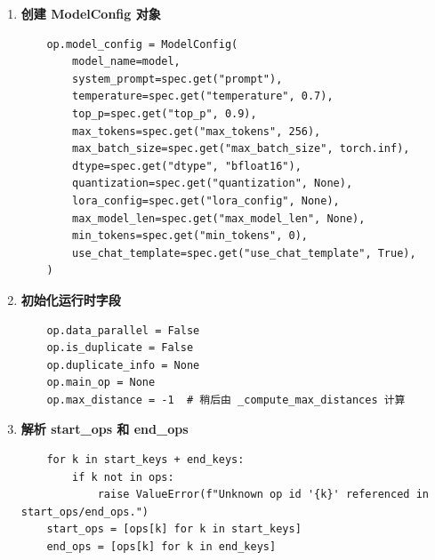 \documentclass[12pt,a4paper]{article}
\begin{document}
\begin{enumerate}
\begin{lstlisting}
        model = spec["model"]
        models.add(model)
        
        # keep_cache 推断逻辑
        explicit_keep = spec.get("keep_cache", None)
        inferred_keep = any(conf_ops[oid2]["model"] == model for oid2 in output_ids)
        op.keep_cache = bool(explicit_keep) if explicit_keep is not None else inferred_keep
    \end{lstlisting}
    
    \textbf{关键逻辑：keep\_cache 推断}
    \begin{itemize}
        \item 如果配置中显式指定了 \texttt{keep\_cache}，则使用该值
        \item 否则，如果该 OP 的任意后继节点使用相同模型，则自动推断为 \texttt{True}
        \item 这有助于优化：如果下游 OP 使用相同模型，保留 cache 可以避免重复计算前缀
    \end{itemize}
    
    \item \textbf{创建 ModelConfig 对象}
    \begin{lstlisting}
    op.model_config = ModelConfig(
        model_name=model,
        system_prompt=spec.get("prompt"),
        temperature=spec.get("temperature", 0.7),
        top_p=spec.get("top_p", 0.9),
        max_tokens=spec.get("max_tokens", 256),
        max_batch_size=spec.get("max_batch_size", torch.inf),
        dtype=spec.get("dtype", "bfloat16"),
        quantization=spec.get("quantization", None),
        lora_config=spec.get("lora_config", None),
        max_model_len=spec.get("max_model_len", None),
        min_tokens=spec.get("min_tokens", 0),
        use_chat_template=spec.get("use_chat_template", True),
    )
    \end{lstlisting}
    
    \item \textbf{初始化运行时字段}
    \begin{lstlisting}
    op.data_parallel = False
    op.is_duplicate = False
    op.duplicate_info = None
    op.main_op = None
    op.max_distance = -1  # 稍后由 _compute_max_distances 计算
    \end{lstlisting}
    
    \item \textbf{解析 start\_ops 和 end\_ops}
    \begin{lstlisting}
    for k in start_keys + end_keys:
        if k not in ops:
            raise ValueError(f"Unknown op id '{k}' referenced in start_ops/end_ops.")
    start_ops = [ops[k] for k in start_keys]
    end_ops = [ops[k] for k in end_keys]
    \end{lstlisting}
    

\end{enumerate}
\end{document}
